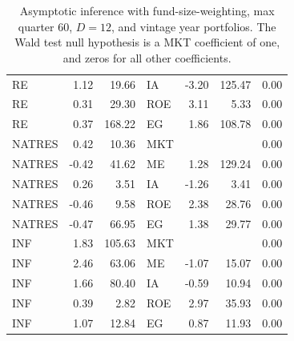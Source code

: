 \documentclass[12pt]{article}
\begin{document}
\begin{table}[ht]
\begin{tabular}{lrrlrrr}
		RE & 1.12 & 19.66 & IA & -3.20 & 125.47 & 0.00 \\ 
		RE & 0.31 & 29.30 & ROE & 3.11 & 5.33 & 0.00 \\ 
		RE & 0.37 & 168.22 & EG & 1.86 & 108.78 & 0.00 \\ 
		\hline
		NATRES & 0.42 & 10.36 & MKT &  &  & 0.00 \\ 
		NATRES & -0.42 & 41.62 & ME & 1.28 & 129.24 & 0.00 \\ 
		NATRES & 0.26 & 3.51 & IA & -1.26 & 3.41 & 0.00 \\ 
		NATRES & -0.46 & 9.58 & ROE & 2.38 & 28.76 & 0.00 \\ 
		NATRES & -0.47 & 66.95 & EG & 1.38 & 29.77 & 0.00 \\ 
		\hline
		INF & 1.83 & 105.63 & MKT &  &  & 0.00 \\ 
		INF & 2.46 & 63.06 & ME & -1.07 & 15.07 & 0.00 \\ 
		INF & 1.66 & 80.40 & IA & -0.59 & 10.94 & 0.00 \\ 
		INF & 0.39 & 2.82 & ROE & 2.97 & 35.93 & 0.00 \\ 
		INF & 1.07 & 12.84 & EG & 0.87 & 11.93 & 0.00 \\ 
		\hline
		\hline
	\end{tabular}
	\caption{Asymptotic inference with fund-size-weighting, max quarter 60, $D=12$, and vintage year portfolios. The Wald test null hypothesis is a MKT coefficient of one, and zeros for all other coefficients.} 
	\label{tab:ai_60_fw_dep_vyp}
\end{table}
\end{document}
